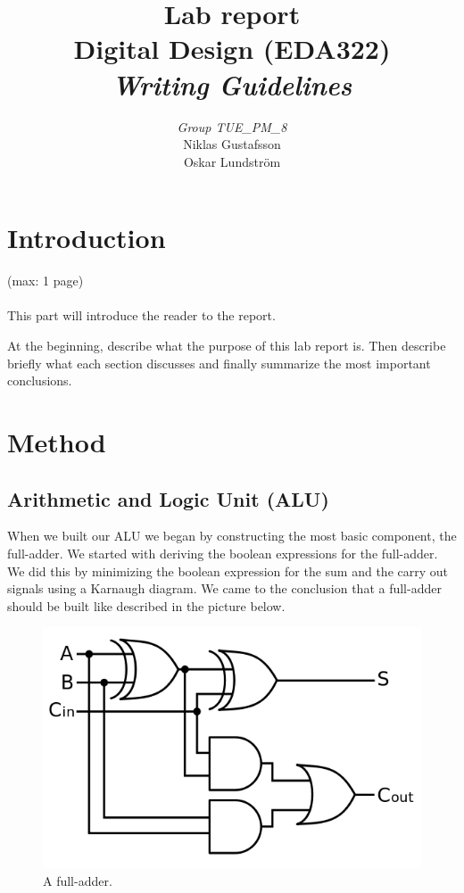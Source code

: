 \documentclass[a4paper,11pt]{article}
\begin{document}
\pagestyle{empty}
\begin{titlepage}

\title{\Huge{Lab report} \\[0.1cm] \Large{Digital Design (EDA322)} \\ [0.4cm] \Large{ \emph{Writing Guidelines}} \\[0.4cm]}
\author{\large{\emph{Group TUE\_PM\_8}} \\[0.2cm] Niklas Gustafsson \\[0.05cm] Oskar Lundström \\[0.1cm]}
\maketitle
\thispagestyle{empty}
\end{titlepage}
\clearpage
\pagestyle{fancyplain}
\tableofcontents
\clearpage
\setcounter{page}{1}
\section{Introduction}
(max: 1 page)
\\\\
This part will introduce the reader to the report. 

At the beginning, describe what the purpose of this lab report is. Then describe briefly what each section discusses and finally summarize the most important conclusions. 

\section{Method}
\subsection{Arithmetic and Logic Unit (ALU)}

When we built our ALU we began by constructing the most basic component, the full-adder. We started with deriving the boolean expressions for the full-adder. We did this by minimizing the boolean expression for the sum and the carry out signals using a Karnaugh diagram. We came to the conclusion that a full-adder should be built like described in the picture below.

\begin{figure}[h!]
  \centering
  \includegraphics[width=0.5\linewidth]{fulladder.png}
  \caption{A full-adder.}
  \label{fig:etikett}
\end{figure}
\end{document}
